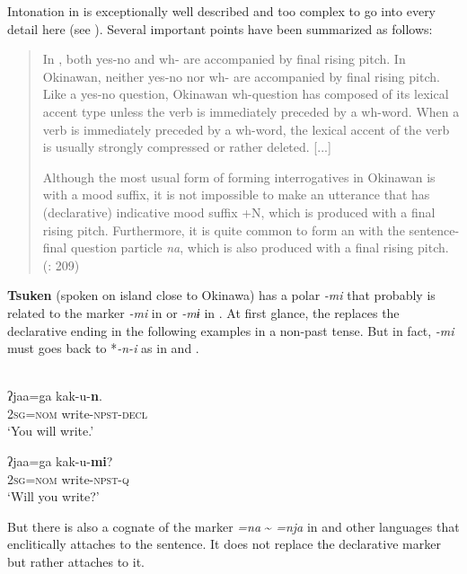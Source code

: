 Intonation in  is exceptionally well described and too complex to go into every detail here (see \citealt{Nagano-Madsen2015}). Several important points have been summarized as follows:

\begin{quote}
In , both yes-no and wh- are accompanied by final rising pitch. In Okinawan, neither yes-no  nor wh- are accompanied by final rising pitch. Like a yes-no question, Okinawan wh-question has  composed of its lexical accent type unless the verb is immediately preceded by a wh-word. When a verb is immediately preceded by a wh-word, the lexical accent of the verb is usually strongly compressed or rather deleted. [...]

Although the most usual form of forming interrogatives in Okinawan is with a mood suffix, it is not impossible to make an utterance that has (declarative) indicative mood suffix +N, which is produced with a final rising pitch. Furthermore, it is quite common to form an  with the sentence-final question particle \textit{na}, which is also produced with a final rising pitch. (\citealt{Nagano-Madsen2015}: 209)
\end{quote}

\textbf{Tsuken} (spoken on  island close to Okinawa) has a polar  \textit{-mi} that probably is related to the marker \textit{-mi} in  or \textit{-mɨ} in . At first glance, the  replaces the declarative ending in the following examples in a non-past tense. But in fact, \textit{-mi} must goes back to *\textit{-n-i} as in  and .

\ea%
    \label{ex:japa:32}
    \\
    \ea
    \gll ʔjaa=ga  kak-u-\textbf{{n}}.\\
    2\textsc{sg}=\textsc{nom}  write-\textsc{npst-decl}\\
    \glt ‘You will write.’
    
    \ex
    \gll ʔjaa=ga  kak-u-\textbf{{mi}}?\\
    2\textsc{sg}=\textsc{nom}  write-\textsc{npst}-\textsc{q}\\
    \glt ‘Will you write?’ \citep[92]{Matayoshi2010}
    \z
    \z

\noindent But there is also a cognate of the marker \textit{=na} {\textasciitilde} \textit{=nja} in  and other languages that enclitically attaches to the sentence. It does not replace the declarative marker but rather attaches to it.

